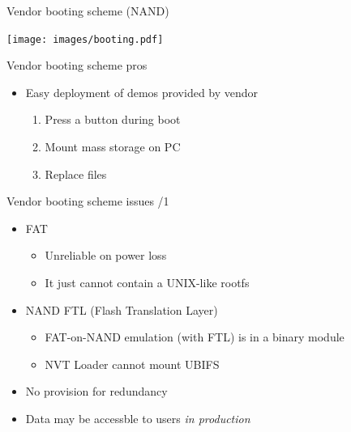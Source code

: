 \documentclass[xetex,table,aspectratio=169]{beamer}
\begin{document}
\begin{frame}{Vendor booting scheme (NAND)}
  \begin{center}
    \texttt{[image: images/booting.pdf]}
  \end{center}
\end{frame}

\begin{frame}{Vendor booting scheme pros}
  \begin{itemize}
  \item Easy deployment of demos provided by vendor
    \begin{enumerate}
    \item Press  a button during boot
    \item Mount mass storage on PC
    \item Replace files
    \end{enumerate}
  \end{itemize}
\end{frame}

\begin{frame}{Vendor booting scheme issues /1}
  \begin{itemize}
  \item FAT
    \begin{itemize}
    \item Unreliable on power loss
    \item It just cannot contain a UNIX-like rootfs
    \end{itemize}
  \item NAND FTL (Flash Translation Layer)
    \begin{itemize}
    \item FAT-on-NAND emulation (with FTL) is in a binary module
    \item NVT Loader cannot mount UBIFS
  \end{itemize}
  \item No provision for redundancy
  \item Data may be accessble to users {\em in production}
  \end{itemize}
\end{frame}
\end{document}
